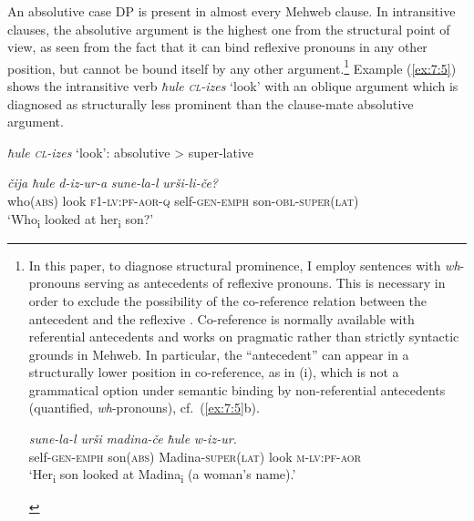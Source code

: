 ﻿\documentclass[output=paper]{langsci/langscibook}
\begin{document}
An absolutive case DP is present in almost every Mehweb clause. In
intransitive clauses, the absolutive argument is the highest one from
the structural point of view, as seen from the fact that it can bind
reflexive pronouns in any other position, but cannot be bound itself by
any other argument.\footnote{In this paper, to diagnose structural
  prominence, I employ sentences with \emph{wh}-pronouns serving as
  antecedents of reflexive pronouns. This is necessary in order to
  exclude the possibility of the co-reference relation between the
  antecedent and the reflexive \citep{reinhart1981}. Co-reference is normally
  available with referential antecedents and works on pragmatic rather
  than strictly syntactic grounds in Mehweb. In particular, the
  ``antecedent'' can appear in a structurally lower position in
  co-reference, as in (i), which is not a grammatical option under
  semantic binding by non-referential antecedents (quantified,
  \emph{wh}-pronouns), cf.\ (\ref{ex:7:5}b).

  \begin{exe}
  \gll \emph{sune-la-l} \emph{urši} \emph{madina-če} \emph{ħule} \emph{w-iz-ur.}\\
  self-\textsc{gen}-\textsc{emph} son(\textsc{abs}) Madina-\textsc{super(lat)} look \textsc{m}-\textsc{lv}:\textsc{pf}-\textsc{aor}\\
  \glt  `Her\textsubscript{i} son looked at Madina\textsubscript{i} (a woman's
  name).'
\end{exe}

\removelastskip

\vspace{-\baselineskip}

}
Example (\ref{ex:7:5}) shows the intransitive verb \emph{ħule \textup{\textsc{cl}}-izes} `look' with an
oblique  argument which is diagnosed as structurally less
prominent than the clause-mate absolutive argument.

\pagebreak

\ea \label{ex:7:5} %
\emph{ħule \textup{\textsc{cl}}-izes} `look': absolutive \textgreater{} super-lative


\ea %
\gll \emph{čija} \emph{ħule} \emph{d-iz-ur-a} \emph{sune-la-l} \emph{urši-li-če?}\\
who(\textsc{abs}) look \textsc{f1-lv}:\textsc{pf}-\textsc{aor}-\textsc{q} self-\textsc{gen}-\textsc{emph} son-\textsc{obl}-\textsc{super(lat)}\\
\glt `Who\textsubscript{i} looked at her\textsubscript{i} son?'
\end{document}
